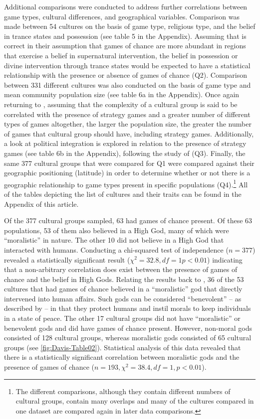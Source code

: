 Additional comparisons were conducted to address further correlations between game types, cultural differences, and geographical variables. Comparison was made between 54 cultures on the basis of game type, religious type, and the belief in trance states and possession (see table 5 in the Appendix). Assuming that \textcite{roberts1959} is correct in their assumption that games of chance are more abundant in regions that exercise a belief in supernatural intervention, the belief in possession or divine intervention through trance states would be expected to have a statistical relationship with the presence or absence of games of chance (Q2). Comparison between 331 different cultures was also conducted on the basis of game type and mean community population size (see table 6a in the Appendix). Once again returning to \textcite{roberts1959}, assuming that the complexity of a cultural group is said to be correlated with the presence of strategy games and a greater number of different types of games altogether, the larger the population size, the greater the number of games that cultural group should have, including strategy games. Additionally, a look at political integration is explored in relation to the presence of strategy games (see table 6b in the Appendix), 
following the study of \textcite{roberts1959} (Q3). Finally, the same 377 cultural groups that were compared for Q1 were compared against their geographic positioning (latitude) in order to determine whether or not there is a geographic relationship to game types present in specific populations (Q4).\footnote{The different comparisons, although they contain different numbers of cultural groups, contain many overlaps and many of the cultures compared in one dataset are compared again in later data comparisons.} All of the tables depicting the list of cultures and their traits can be found in the Appendix of this article.

Of the 377 cultural groups sampled, 63 had games of chance present. Of these 63 populations, 53 of them also believed in a High God, many of which were ``moralistic” in nature. %
The other 10 did not believe in a High God that interacted with humans. Conducting a chi-squared test of independence ($n = 377$) revealed a statistically significant result ($\chi^{2} = 32.8, df = 1 p < 0.01$) indicating that a non-arbitrary correlation does exist between the presence of games of chance and the belief in High Gods. Relating the results back to \textcite{roberts1959}, 36 of the 53 cultures that had games of chance believed in a ``moralistic” god that directly intervened into human affairs. Such gods can be considered ``benevolent” – as described by \textcite{lambert1959} – in that they protect humans and instil morals to keep individuals in a state of peace. The other 17 cultural groups did not have ``moralistic” or benevolent gods and did have games of chance present. However, non-moral gods consisted of 128 cultural groups, whereas moralistic gods consisted of 65 cultural groups (see \cref{fig:Davis-Table02}). Statistical analysis of this data revealed that there is a statistically significant correlation between moralistic gods and the presence of games of chance ($n = 193, \chi^{2} = 38.4, df = 1, p < 0.01$).

